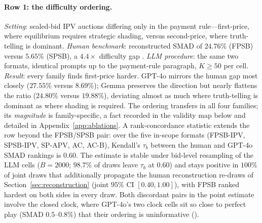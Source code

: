 \paragraph{Row 1: the difficulty ordering.}
\emph{Setting}: sealed-bid IPV auctions differing only in the payment rule---first-price, where equilibrium requires strategic shading, versus second-price, where truth-telling is dominant. \emph{Human benchmark}: reconstructed SMAD of $24.76\%$ (FPSB) versus $5.65\%$ (SPSB), a $4.4\times$ difficulty gap \citep{kagel1993independent}. \emph{LLM procedure}: the same two formats, identical prompts up to the payment-rule paragraph, $K \ge 50$ per cell. \emph{Result}: every family finds first-price harder. GPT-4o mirrors the human gap most closely ($27.55\%$ versus $8.69\%$); Gemma preserves the direction but nearly flattens the ratio ($24.80\%$ versus $19.88\%$), deviating almost as much where truth-telling is dominant as where shading is required. The ordering transfers in all four families; its \emph{magnitude} is family-specific, a fact recorded in the validity map below and detailed in Appendix~\ref{app:ablations}. A rank-concordance statistic extends the row beyond the FPSB/SPSB pair: over the five in-scope formats (FPSB-IPV, SPSB-IPV, SP-APV, AC, AC-B), Kendall's $\tau_b$ between the human and GPT-4o SMAD rankings is $0.60$. The estimate is stable under bid-level resampling of the LLM cells ($B=2000$; $98.7\%$ of draws leave $\tau_b$ at $0.60$) and stays positive in $100\%$ of joint draws that additionally propagate the human reconstruction re-draws of Section~\ref{sec:reconstruction} (joint $95\%$ CI $[0.40, 1.00]$), with FPSB ranked hardest on both sides in every draw. Both discordant pairs in the point estimate involve the closed clock, where GPT-4o's two clock cells sit so close to perfect play (SMAD $0.5$--$0.8\%$) that their ordering is uninformative ().

